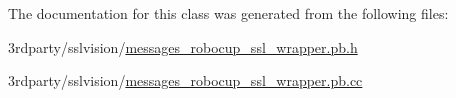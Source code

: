 The documentation for this class was generated from the following files\-:\begin{DoxyCompactItemize}
\item 
3rdparty/sslvision/\hyperlink{messages__robocup__ssl__wrapper_8pb_8h}{messages\-\_\-robocup\-\_\-ssl\-\_\-wrapper.\-pb.\-h}\item 
3rdparty/sslvision/\hyperlink{messages__robocup__ssl__wrapper_8pb_8cc}{messages\-\_\-robocup\-\_\-ssl\-\_\-wrapper.\-pb.\-cc}\end{DoxyCompactItemize}
